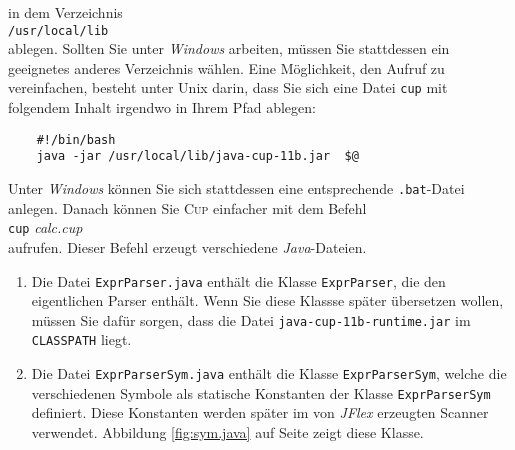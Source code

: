 in dem Verzeichnis 
\\[0.2cm]
\hspace*{1.3cm}
\texttt{/usr/local/lib}
\\[0.2cm]
ablegen.  Sollten Sie unter \textsl{Windows} arbeiten, m\"ussen Sie stattdessen ein geeignetes anderes
Verzeichnis w\"ahlen.  Eine M\"oglichkeit, den Aufruf zu vereinfachen, besteht unter Unix darin, dass Sie sich
eine Datei \texttt{cup} mit folgendem Inhalt irgendwo in Ihrem Pfad ablegen:
\begin{verbatim}
    #!/bin/bash 
    java -jar /usr/local/lib/java-cup-11b.jar  $@
\end{verbatim} %
Unter \textsl{Windows} k\"onnen Sie sich stattdessen eine entsprechende \texttt{.bat}-Datei anlegen.
Danach k\"onnen Sie \textsc{Cup} einfacher mit dem Befehl
\\[0.2cm]
\hspace*{1.3cm}
\texttt{cup} \textsl{calc.cup}
\\[0.2cm]
aufrufen.  Dieser Befehl erzeugt verschiedene \textsl{Java}-Dateien.
\begin{enumerate}
\item Die Datei \texttt{ExprParser.java} enth\"alt die Klasse \texttt{ExprParser}, die den eigentlichen
      Parser enth\"alt.  Wenn Sie diese Klassse sp\"ater \"ubersetzen wollen, m\"ussen Sie daf\"ur
      sorgen, dass die Datei \texttt{java-cup-11b-runtime.jar} im \texttt{CLASSPATH} liegt.
\item Die Datei \texttt{ExprParserSym.java} enth\"alt die Klasse \texttt{ExprParserSym}, welche die verschiedenen
      Symbole als statische Konstanten  der  Klasse \texttt{ExprParserSym} definiert.  
      Diese Konstanten werden sp\"ater im von \textsl{JFlex} erzeugten Scanner verwendet. Abbildung
      \ref{fig:sym.java} auf Seite \pageref{fig:sym.java} zeigt diese Klasse.
\end{enumerate}

